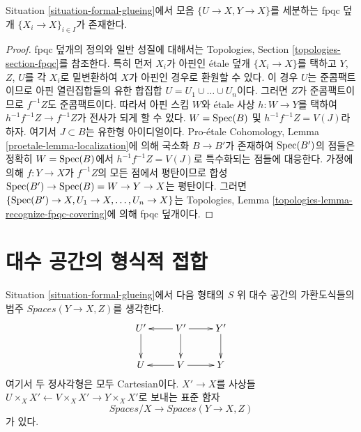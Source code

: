 \begin{lemma}
\label{lemma-dominate-by-fpqc-covering}
Situation \ref{situation-formal-glueing}에서 모음
$\{U \to X, Y \to X\}$를 세분하는 fpqc 덮개
$\{X_i \to X\}_{i \in I}$가 존재한다.
\end{lemma}

\begin{proof}
fpqc 덮개의 정의와 일반 성질에 대해서는 Topologies, Section
\ref{topologies-section-fpqc}를 참조한다. 특히 먼저 $X_i$가 아핀인
\'etale 덮개 $\{X_i \to X\}$를 택하고 $Y$, $Z$, $U$를 각 $X_i$로
밑변환하여 $X$가 아핀인 경우로 환원할 수 있다. 이 경우 $U$는
준콤팩트이므로 아핀 열린집합들의 유한 합집합
$U = U_1 \cup \ldots \cup U_n$이다. 그러면 $Z$가 준콤팩트이므로
$f^{-1}Z$도 준콤팩트이다. 따라서 아핀 스킴 $W$와 \'etale 사상
$h : W \to Y$를 택하여 $h^{-1}f^{-1}Z \to f^{-1}Z$가 전사가 되게
할 수 있다. $W = \mathop{\mathrm{Spec}}(B)$ 및 $h^{-1}f^{-1}Z = V(J)$라 하자.
여기서 $J \subset B$는 유한형 아이디얼이다. Pro-\'etale Cohomology,
Lemma \ref{proetale-lemma-localization}에 의해 국소화 $B \to B'$가
존재하여 $\mathop{\mathrm{Spec}}(B')$의 점들은 정확히 $W = \mathop{\mathrm{Spec}}(B)$에서
$h^{-1}f^{-1}Z = V(J)$로 특수화되는 점들에 대응한다. 가정에 의해
$f : Y \to X$가 $f^{-1}Z$의 모든 점에서 평탄이므로 합성
$\mathop{\mathrm{Spec}}(B') \to \mathop{\mathrm{Spec}}(B) = W \to Y \to X$는 평탄이다. 그러면
$\{\mathop{\mathrm{Spec}}(B') \to X, U_1 \to X, \ldots, U_n \to X\}$는
Topologies, Lemma \ref{topologies-lemma-recognize-fpqc-covering}에 의해
fpqc 덮개이다.
\end{proof}

\section{대수 공간의 형식적 접합}
\label{section-formal-glueing-spaces}

\noindent
Situation \ref{situation-formal-glueing}에서 다음 형태의 $S$ 위 대수 공간의
가환도식들의 범주 $\textit{Spaces}(Y \to X, Z)$를 생각한다.
$$
\xymatrix{
U' \ar[d] & V' \ar[l] \ar[d] \ar[r] & Y' \ar[d] \\
U & V \ar[l] \ar[r] & Y
}
$$
여기서 두 정사각형은 모두 Cartesian이다. $X' \to X$를 사상들
$U \times_X X' \leftarrow V \times_X X' \rightarrow Y \times_X X'$로
보내는 표준 함자
\begin{equation}
\label{equation-formal-glueing-spaces}
\textit{Spaces}/X \longrightarrow \textit{Spaces}(Y \to X, Z)
\end{equation}
가 있다.

